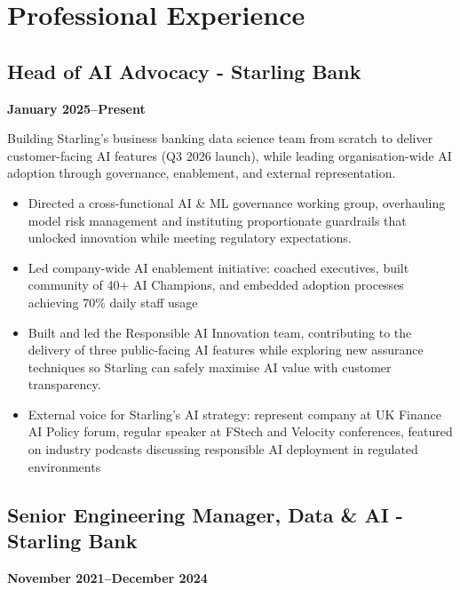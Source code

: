 \documentclass[a4paper]{scrartcl}
\begin{document}
\section*{Professional Experience}

\subsection*{Head of AI Advocacy - Starling Bank}
\textbf{January 2025--Present}

Building Starling's business banking data science team from scratch to deliver customer-facing AI features (Q3 2026 launch), while leading organisation-wide AI adoption through governance, enablement, and external representation.
\begin{itemize}
	\item Directed a cross-functional AI \& ML governance working group, overhauling model risk management and instituting proportionate guardrails that unlocked innovation while meeting regulatory expectations.
	\item Led company-wide AI enablement initiative: coached executives, built community of 40+ AI Champions, and embedded adoption processes achieving 70\% daily staff usage
	\item Built and led the Responsible AI Innovation team, contributing to the delivery of three public-facing AI features while exploring new assurance techniques so Starling can safely maximise AI value with customer transparency.
	\item External voice for Starling's AI strategy: represent company at UK Finance AI Policy forum, regular speaker at FStech and Velocity conferences, featured on industry podcasts discussing responsible AI deployment in regulated environments
\end{itemize}

\subsection*{Senior Engineering Manager, Data \& AI - Starling Bank}
\textbf{November 2021--December 2024}
\end{document}
